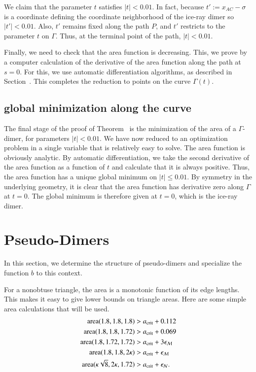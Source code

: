 We claim that the parameter $t$ satisfies $|t|<0.01$.  In fact,
because $t' := x_{AC}-\sigma$ is a coordinate defining the coordinate
neighborhood of the ice-ray dimer so $|t'|<0.01$.  Also, $t'$ remains
fixed along the path $P$, and $t'$ restricts to the parameter $t$ on
$\Gamma$.  Thus, at the terminal point of the path, $|t|<0.01$.

Finally, we need to check that the area function is decreasing. This,
we prove by a computer calculation of the derivative of the area
function along the path at $s=0$.  For this, we use automatic
differentiation algorithms, as described in
Section~.  This completes the reduction to points
on the curve $\Gamma(t)$.

\subsection{global minimization along the curve}

The final stage of the proof of Theorem~ is the
minimization of the area of a $\Gamma$-dimer, for parameters
$|t|<0.01$.  We have now reduced to an optimization problem in a
single variable that is relatively easy to solve.  The area function
is obviously analytic.  By automatic differentiation, we take the
second derivative of the area function as a function of $t$ and
calculate that it is always positive.  Thus, the area function has a
unique global minimum on $|t|\le 0.01$.  By symmetry in the underlying
geometry, it is clear that the area function has derivative zero along
$\Gamma$ at $t=0$.  The global minimum is therefore given at $t=0$,
which is the ice-ray dimer.

\section{Pseudo-Dimers}

In this section, we determine the structure of pseudo-dimers and
specialize the function $b$ to this context.

For a nonobtuse triangle, the area is a monotonic function of its edge
lengths.  This makes it easy to give lower bounds on triangle areas.
Here are some simple area calculations that will be used.
\begin{align*}
{\operatorname{area}}(1.8,1.8,1.8) &> a_\text{crit} + 0.112\\
{\operatorname{area}}(1.8,1.8,1.72) &> a_\text{crit} + 0.069\\
{\operatorname{area}}(1.8,1.72,1.72) &> a_\text{crit} + 3\epsilon_{\mathcal M}\\
{\operatorname{area}}(1.8,1.8,2\kappa) &> a_\text{crit} + \epsilon_{\mathcal M}\\
{\operatorname{area}}(\kappa\sqrt8,2\kappa,1.72) &> a_\text{crit} +\epsilon_{\mathcal N}.
\end{align*}

